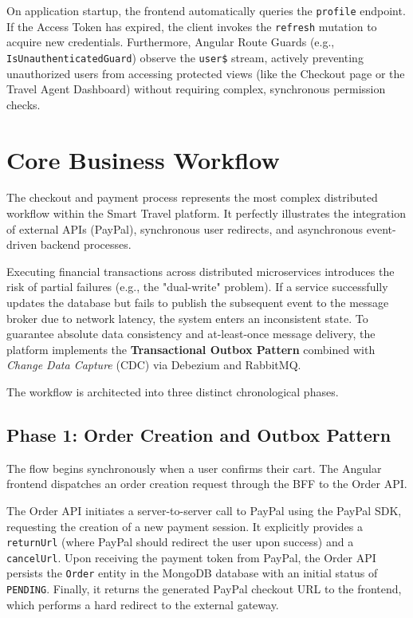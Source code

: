 On application startup, the frontend automatically queries the \texttt{profile} endpoint. If the Access Token has expired, the client invokes the \texttt{refresh} mutation to acquire new credentials. Furthermore, Angular Route Guards (e.g., \texttt{IsUnauthenticatedGuard}) observe the \texttt{user\$} stream, actively preventing unauthorized users from accessing protected views (like the Checkout page or the Travel Agent Dashboard) without requiring complex, synchronous permission checks.


\section{Core Business Workflow}
\label{sec:core_workflows}

The checkout and payment process represents the most complex distributed workflow within the Smart Travel platform. It perfectly illustrates the integration of external APIs (PayPal), synchronous user redirects, and asynchronous event-driven backend processes. 

Executing financial transactions across distributed microservices introduces the risk of partial failures (e.g., the "dual-write" problem). If a service successfully updates the database but fails to publish the subsequent event to the message broker due to network latency, the system enters an inconsistent state. To guarantee absolute data consistency and at-least-once message delivery, the platform implements the \textbf{Transactional Outbox Pattern} combined with \textit{Change Data Capture} (\gls{CDC}) via Debezium and RabbitMQ.
 
The workflow is architected into three distinct chronological phases.

\subsection{Phase 1: Order Creation and Outbox Pattern}

The flow begins synchronously when a user confirms their cart. The Angular frontend dispatches an order creation request through the \gls{BFF} to the Order API. 

The Order API initiates a server-to-server call to PayPal using the PayPal SDK, requesting the creation of a new payment session. It explicitly provides a \texttt{returnUrl} (where PayPal should redirect the user upon success) and a \texttt{cancelUrl}. Upon receiving the payment token from PayPal, the Order API persists the \texttt{Order} entity in the MongoDB database with an initial status of \texttt{PENDING}. Finally, it returns the generated PayPal checkout URL to the frontend, which performs a hard redirect to the external gateway.

